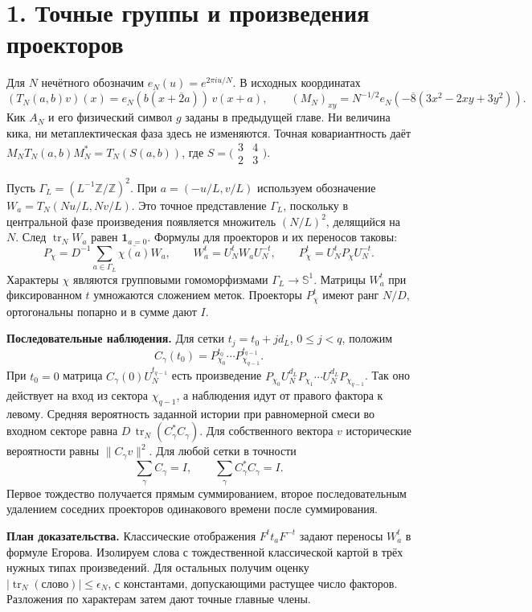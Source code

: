 \documentclass[11pt,a4paper]{article}
\newcommand{\trn}{\operatorname{tr}_N}
\newcommand{\Z}{\mathbb Z}
\newcommand{\sect}[1]{\section*{\sffamily\color{ink}#1}}
\newcommand{\subt}[1]{\par\medskip\noindent\textbf{#1.}\quad}
\begin{document}
\newpage
\sect{1. Точные группы и произведения проекторов}
Для \(N\) нечётного обозначим \(e_N(u)=e^{2\pi i u/N}\). В исходных координатах
\[
 (T_N(a,b)v)(x)=e_N(b(x+\overline2 a))\,v(x+a),\qquad
 (M_N)_{xy}=N^{-1/2}e_N(-\overline8(3x^2-2xy+3y^2)).
\]
Кик \(A_N\) и его физический символ \(g\) заданы в предыдущей главе. Ни величина кика, ни метаплектическая фаза здесь не изменяются. Точная ковариантность даёт \(M_N T_N(a,b)M_N^*=T_N(S(a,b))\), где \(S=\bigl(\begin{smallmatrix}3&4\\ 2&3\end{smallmatrix}\bigr)\).

Пусть \(\Gamma_L=(L^{-1}\Z/\Z)^2\). При \(a=(-u/L,v/L)\) используем обозначение \(W_a=T_N(Nu/L,Nv/L)\). Это точное представление \(\Gamma_L\), поскольку в центральной фазе произведения появляется множитель \((N/L)^2\), делящийся на \(N\). След \(\trn W_a\) равен \(\mathbf 1_{a=0}\). Формулы для проекторов и их переносов таковы:
\[
 P_\chi=D^{-1}\sum_{a\in\Gamma_L}\overline{\chi(a)}W_a,\qquad
 W^t_a=U_N^t W_a U_N^{-t},\qquad
 P^t_\chi=U_N^t P_\chi U_N^{-t}.
\]
Характеры \(\chi\) являются групповыми гомоморфизмами \(\Gamma_L\to\mathbb S^1\). Матрицы \(W^t_a\) при фиксированном \(t\) умножаются сложением меток. Проекторы \(P_\chi^t\) имеют ранг \(N/D\), ортогональны попарно и в сумме дают \(I\).

\subt{Последовательные наблюдения}
Для сетки \(t_j=t_0+j d_L\), \(0\le j<q\), положим
\[
 C_\gamma(t_0)=P^{t_0}_{\chi_0}\cdots P^{t_{q-1}}_{\chi_{q-1}}.
\]
При \(t_0=0\) матрица \(C_\gamma(0)U_N^{t_{q-1}}\) есть произведение
\(P_{\chi_0}U_N^{d_L}P_{\chi_1}\cdots U_N^{d_L}P_{\chi_{q-1}}\).
Так оно действует на вход из сектора \(\chi_{q-1}\), а наблюдения идут от правого фактора к левому. Средняя вероятность заданной истории при равномерной смеси во входном секторе равна \(D\,\trn(C_\gamma^* C_\gamma)\). Для собственного вектора \(v\) исторические вероятности равны \(\|C_\gamma v\|^2\). Для любой сетки в точности
\[
               \sum_\gamma C_\gamma=I,\qquad
               \sum_\gamma C_\gamma^* C_\gamma=I .
\]
Первое тождество получается прямым суммированием, второе последовательным удалением соседних проекторов одинакового времени после суммирования.

\subt{План доказательства}
Классические отображения \(F^t t_a F^{-t}\) задают переносы \(W_a^t\) в формуле Егорова. Изолируем слова с тождественной классической картой в трёх нужных типах произведений. Для остальных получим оценку \(|\trn(\text{слово})|\le\epsilon_N\), с константами, допускающими растущее число факторов. Разложения по характерам затем дают точные главные члены.
\end{document}
